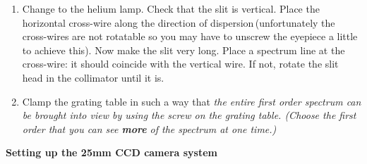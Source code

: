 \documentclass[12pt]{article}
\begin{document}
\begin{enumerate}
\item Change to the helium lamp. Check that the slit is vertical. Place the horizontal cross-wire along the direction of dispersion\,(unfortunately the cross-wires are not rotatable so you may have to  unscrew the eyepiece a little to achieve this). Now make the slit very long. Place a spectrum line at the cross-wire: it should coincide with the vertical wire. If not, rotate the slit head in the collimator until it is.

\item Clamp the grating table in such a way that {\sl the entire first order spectrum can be brought into view by using the screw on the grating table. (Choose the first order that you can see {\bf more} of the spectrum at one time.)}

\end{enumerate}

\newpage




{\bf Setting up the 25mm CCD camera system}

\begin{center}
\centerline{}
\end{center}
\end{document}

